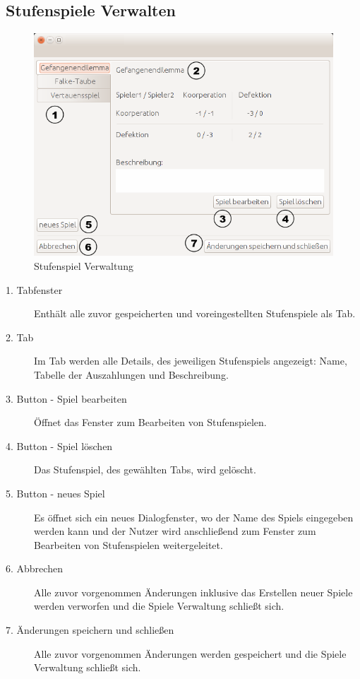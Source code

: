 \pagebreak

\subsection{Stufenspiele Verwalten}

\begin{figure}[!hp] 
  \centering
     \includegraphics[width=1.1\textwidth]{GUI_Entwurf/SpieleVerwalten.png}
  \caption{Stufenspiel Verwaltung}
  \label{fig:Bild1}
\end{figure}

\begin{description}

\item[1. Tabfenster] Enthält alle zuvor gespeicherten und voreingestellten Stufenspiele als Tab.

\item[2. Tab] Im Tab werden alle Details, des jeweiligen Stufenspiels angezeigt: Name, Tabelle der Auszahlungen und Beschreibung.

\item[3. Button - Spiel bearbeiten] Öffnet das Fenster zum Bearbeiten von Stufenspielen.

\item[4. Button - Spiel löschen] Das Stufenspiel, des gewählten Tabs, wird gelöscht.

\item[5. Button - neues Spiel] Es öffnet sich ein neues Dialogfenster, wo der Name des Spiels eingegeben werden kann und der Nutzer wird anschließend zum Fenster zum Bearbeiten von Stufenspielen weitergeleitet.

\item[6. Abbrechen] Alle zuvor vorgenommen Änderungen inklusive das Erstellen neuer Spiele werden verworfen und die Spiele Verwaltung schließt sich.

\item[7. Änderungen speichern und schließen] Alle zuvor vorgenommen Änderungen werden gespeichert und die Spiele Verwaltung schließt sich.

\end{description}



